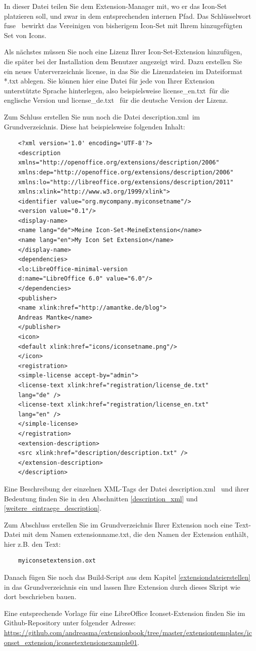 \documentclass[12pt,a4paper,titlepage]{book}
\begin{document}
In dieser Datei teilen Sie dem Extension-Manager mit, wo er das Icon-Set platzieren soll, und zwar in dem entsprechenden internen Pfad.  Das Schlüsselwort \glqq fuse\grqq~
bewirkt das Vereinigen von bisherigem Icon-Set mit Ihrem hinzugefügten Set von Icons.

Als nächstes müssen Sie noch eine Lizenz Ihrer Icon-Set-Extension hinzufügen, die später bei der Installation dem Benutzer angezeigt wird. Dazu erstellen Sie ein neues Unterverzeichnis \glqq license\grqq, in das Sie die Lizenzdateien im Dateiformat *.txt ablegen. Sie können hier eine Datei für jede von Ihrer Extension unterstützte Sprache hinterlegen, also beispielsweise \glqq license\_en.txt\grqq~für die englische Version und \glqq license\_de.txt\grqq~ für die deutsche Version der Lizenz.

Zum Schluss erstellen Sie nun noch die Datei \glqq description.xml\grqq~im Grundverzeichnis. Diese hat beispielsweise folgenden Inhalt:

\begin{lstlisting}
	<?xml version='1.0' encoding='UTF-8'?>
	<description
	xmlns="http://openoffice.org/extensions/description/2006"
	xmlns:dep="http://openoffice.org/extensions/description/2006"
	xmlns:lo="http://libreoffice.org/extensions/description/2011"
	xmlns:xlink="http://www.w3.org/1999/xlink">
	<identifier value="org.mycompany.myiconsetname"/>
	<version value="0.1"/>
	<display-name>
	<name lang="de">Meine Icon-Set-MeineExtension</name>
	<name lang="en">My Icon Set Extension</name>
	</display-name>
	<dependencies>
	<lo:LibreOffice-minimal-version 
	d:name="LibreOffice 6.0" value="6.0"/>
	</dependencies>
	<publisher>
	<name xlink:href="http://amantke.de/blog">
	Andreas Mantke</name>
	</publisher>
	<icon>
	<default xlink:href="icons/iconsetname.png"/>
	</icon>
	<registration>
	<simple-license accept-by="admin">
	<license-text xlink:href="registration/license_de.txt" 
	lang="de" />
	<license-text xlink:href="registration/license_en.txt" 
	lang="en" />
	</simple-license>
	</registration>
	<extension-description>
	<src xlink:href="description/description.txt" />
	</extension-description>
	</description>
\end{lstlisting}

Eine Beschreibung der einzelnen XML-Tags der Datei \glqq description.xml\grqq~ und ihrer Bedeutung finden Sie in den Abschnitten \ref{description_xml} und \ref{weitere_eintraege_description}.

Zum Abschluss erstellen Sie im Grundverzeichnis Ihrer Extension noch eine Text-Datei mit dem Namen \glqq extensionname.txt\grqq, die den Namen der Extension enthält, hier z.B. den Text:
\begin{lstlisting}
	myiconsetextension.oxt
\end{lstlisting}

Danach fügen Sie noch das Build-Script aus dem Kapitel \ref{extensiondateierstellen} in das Grundverzeichnis ein und lassen Ihre Extension durch dieses Skript wie dort beschrieben bauen.

Eine entsprechende Vorlage für eine LibreOffice Iconset-Extension finden Sie im Github-Repository unter folgender Adresse:\linebreak
\url{https://github.com/andreasma/extensionbook/tree/master/extensiontemplates/iconset_extension/iconsetextensionexample01}.
\end{document}
